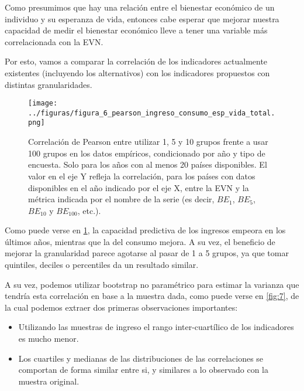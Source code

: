 Como presumimos que hay una relación entre el bienestar económico de un individuo y su esperanza de vida, entonces cabe esperar que mejorar nuestra capacidad de medir el bienestar económico lleve a tener una variable más correlacionada con la EVN.

Por esto, vamos a comparar la correlación de los indicadores actualmente existentes (incluyendo los alternativos) con los indicadores propuestos con distintas granularidades.


\begin{figure}[H] %
    \centering %
    \texttt{[image: ../figuras/figura\_6\_pearson\_ingreso\_consumo\_esp\_vida\_total.png]} %
    \caption{Correlación de Pearson entre utilizar 1, 5 y 10 grupos frente a usar 100 grupos en los datos empíricos, condicionado por año y tipo de encuesta. Solo para los años con al menos 20 países disponibles. El valor en el eje Y refleja la correlación, para los países con datos disponibles en el año indicado por el eje X, entre la EVN y la métrica indicada por el nombre de la serie (es decir, $BE_1$, $BE_5$, $BE_{10}$ y $BE_{100}$, etc.). }
    \label{fig:6} %
\end{figure}

Como puede verse en \ref{fig:6}, la capacidad predictiva de los ingresos empeora en los últimos años, mientras que la del consumo mejora. A su vez, el beneficio de mejorar la granularidad parece agotarse al pasar de 1 a 5 grupos, ya que tomar quintiles, deciles o percentiles da un resultado similar.

A su vez, podemos utilizar bootstrap no paramétrico para estimar la varianza que tendría esta correlación en base a la muestra dada, como puede verse en \ref{fig:7}, de la cual podemos extraer dos primeras observaciones importantes:

\begin{itemize}
    \item Utilizando las muestras de ingreso el rango inter-cuartílico de los indicadores es mucho menor.
    \item Los cuartiles y medianas de las distribuciones de las correlaciones se comportan de forma similar entre si, y similares a lo observado con la muestra original.
\end{itemize}

